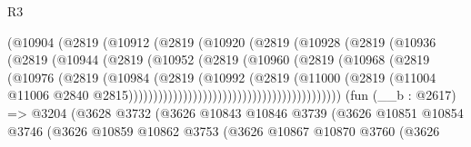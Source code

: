 \begin{lexlean}{R3}
\begin{coremodule}
                                    (@10904
                                      (@2819
                                        (@10912
                                          (@2819
                                            (@10920
                                              (@2819
                                                (@10928
                                                  (@2819
                                                    (@10936
                                                      (@2819
                                                        (@10944
                                                          (@2819
                                                            (@10952
                                                              (@2819
                                                                (@10960
                                                                  (@2819
                                                                    (@10968
                                                                      (@2819
                                                                        (@10976
                                                                          (@2819
                                                                            (@10984
                                                                              (@2819
                                                                                (@10992
                                                                                  (@2819
                                                                                    (@11000
                                                                                      (@2819
                                                                                        (@11004
                                                                                          @11006
                                                                                          @2840
                                                                                          @2815)))))))))))))))))))))))))))))))))))))))))))
    (fun (__b : @2617) =>
    @3204
      (@3628
        @3732
        (@3626
          @10843
          @10846
          @3739
          (@3626
            @10851
            @10854
            @3746
            (@3626
              @10859
              @10862
              @3753
              (@3626
                @10867
                @10870
                @3760
                (@3626

\end{coremodule}
\end{lexlean}
